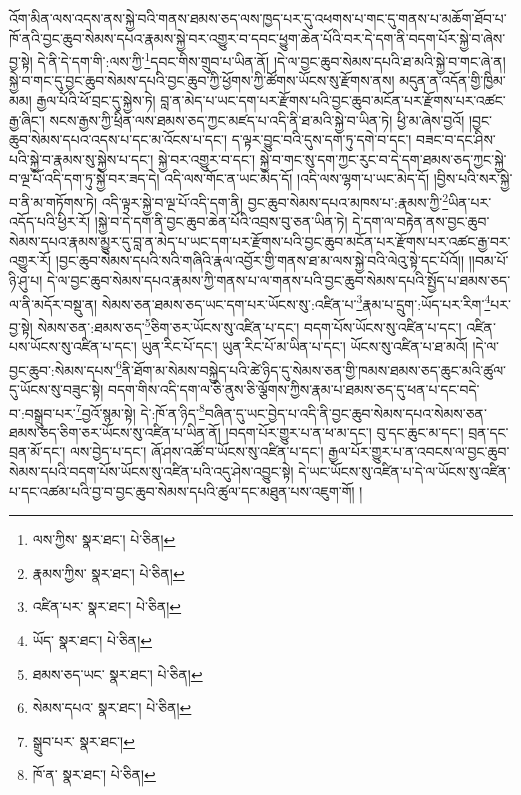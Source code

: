འོག་མིན་ལས་འདས་ནས་སྐྱེ་བའི་གནས་ཐམས་ཅད་ལས་ཁྱད་པར་དུ་འཕགས་པ་གང་དུ་གནས་པ་མཆོག་ཐོབ་པ་ཁོ་ནའི་བྱང་ཆུབ་སེམས་དཔའ་རྣམས་སྐྱེ་བར་འགྱུར་བ་དབང་ཕྱུག་ཆེན་པོའི་བར་དེ་དག་ནི་བདག་པོར་སྐྱེ་བ་ཞེས་བྱ་སྟེ། དེ་ནི་དེ་དག་གི་:ལས་ཀྱི་\footnote{ལས་ཀྱིས་  སྣར་ཐང་།  པེ་ཅིན། }དབང་གིས་གྲུབ་པ་ཡིན་ནོ། །དེ་ལ་བྱང་ཆུབ་སེམས་དཔའི་ཐ་མའི་སྐྱེ་བ་གང་ཞེ་ན། སྐྱེ་བ་གང་དུ་བྱང་ཆུབ་སེམས་དཔའི་བྱང་ཆུབ་ཀྱི་ཕྱོགས་ཀྱི་ཚོགས་ཡོངས་སུ་རྫོགས་ནས། མདུན་ན་འདོན་གྱི་ཁྱིམ་མམ། རྒྱལ་པོའི་ཕོ་བྲང་དུ་སྐྱེས་ཏེ། བླ་ན་མེད་པ་ཡང་དག་པར་རྫོགས་པའི་བྱང་ཆུབ་མངོན་པར་རྫོགས་པར་འཚང་རྒྱ་ཞིང་། སངས་རྒྱས་ཀྱི་ཕྲིན་ལས་ཐམས་ཅད་ཀྱང་མཛད་པ་འདི་ནི་ཐ་མའི་སྐྱེ་བ་ཡིན་ཏེ། ཕྱི་མ་ཞེས་བྱའོ། །བྱང་ཆུབ་སེམས་དཔའ་འདས་པ་དང་མ་འོངས་པ་དང་། ད་ལྟར་བྱུང་བའི་དུས་དག་ཏུ་དགེ་བ་དང་། བཟང་བ་དང་ཤིས་པའི་སྐྱེ་བ་རྣམས་སུ་སྐྱེས་པ་དང་། སྐྱེ་བར་འགྱུར་བ་དང་། སྐྱེ་བ་གང་སུ་དག་ཀྱང་རུང་བ་དེ་དག་ཐམས་ཅད་ཀྱང་སྐྱེ་བ་ལྔ་པོ་འདི་དག་ཏུ་སྐྱེ་བར་ཟད་དེ། འདི་ལས་གོང་ན་ཡང་མེད་དོ། །འདི་ལས་ལྷག་པ་ཡང་མེད་དོ། །བྱིས་པའི་སར་སྐྱེ་བ་ནི་མ་གཏོགས་ཏེ། འདི་ལྟར་སྐྱེ་བ་ལྔ་པོ་འདི་དག་ནི། བྱང་ཆུབ་སེམས་དཔའ་མཁས་པ་:རྣམས་ཀྱི་\footnote{རྣམས་ཀྱིས་  སྣར་ཐང་།  པེ་ཅིན། }ཡིན་པར་འདོད་པའི་ཕྱིར་རོ། །སྐྱེ་བ་དེ་དག་ནི་བྱང་ཆུབ་ཆེན་པོའི་འབྲས་བུ་ཅན་ཡིན་ཏེ། དེ་དག་ལ་བརྟེན་ནས་བྱང་ཆུབ་སེམས་དཔའ་རྣམས་མྱུར་དུ་བླ་ན་མེད་པ་ཡང་དག་པར་རྫོགས་པའི་བྱང་ཆུབ་མངོན་པར་རྫོགས་པར་འཚང་རྒྱ་བར་འགྱུར་རོ། །བྱང་ཆུབ་སེམས་དཔའི་སའི་གཞིའི་རྣལ་འབྱོར་གྱི་གནས་ཐ་མ་ལས་སྐྱེ་བའི་ལེའུ་སྟེ་དང་པོའོ།། །།བམ་པོ་ཉི་ཤུ་པ། དེ་ལ་བྱང་ཆུབ་སེམས་དཔའ་རྣམས་ཀྱི་གནས་པ་ལ་གནས་པའི་བྱང་ཆུབ་སེམས་དཔའི་སྤྱོད་པ་ཐམས་ཅད་ལ་ནི་མདོར་བསྡུ་ན། སེམས་ཅན་ཐམས་ཅད་ཡང་དག་པར་ཡོངས་སུ་:འཛིན་པ་\footnote{འཛིན་པར་  སྣར་ཐང་།  པེ་ཅིན། }རྣམ་པ་དྲུག་:ཡོད་པར་རིག་\footnote{ཡོད་  སྣར་ཐང་།  པེ་ཅིན། }པར་བྱ་སྟེ། སེམས་ཅན་:ཐམས་ཅད་\footnote{ཐམས་ཅད་ཡང་  སྣར་ཐང་།  པེ་ཅིན། }ཅིག་ཅར་ཡོངས་སུ་འཛིན་པ་དང་། བདག་པོས་ཡོངས་སུ་འཛིན་པ་དང་། འཛིན་པས་ཡོངས་སུ་འཛིན་པ་དང་། ཡུན་རིང་པོ་དང་། ཡུན་རིང་པོ་མ་ཡིན་པ་དང་། ཡོངས་སུ་འཛིན་པ་ཐ་མའོ། །དེ་ལ་བྱང་ཆུབ་:སེམས་དཔས་\footnote{སེམས་དཔའ་  སྣར་ཐང་།  པེ་ཅིན། }ནི་ཐོག་མ་སེམས་བསྐྱེད་པའི་ཚེ་ཉིད་དུ་སེམས་ཅན་གྱི་ཁམས་ཐམས་ཅད་ཆུང་མའི་ཚུལ་དུ་ཡོངས་སུ་བཟུང་སྟེ། བདག་གིས་འདི་དག་ལ་ཅི་ནུས་ཅི་ལྕོགས་ཀྱིས་རྣམ་པ་ཐམས་ཅད་དུ་ཕན་པ་དང་བདེ་བ་:བསྒྲུབ་པར་\footnote{སྒྲུབ་པར་  སྣར་ཐང་། }བྱའོ་སྙམ་སྟེ། དེ་:ཁོ་ན་ཉིད་\footnote{ཁོ་ན་  སྣར་ཐང་།  པེ་ཅིན། }བཞིན་དུ་ཡང་བྱེད་པ་འདི་ནི་བྱང་ཆུབ་སེམས་དཔའ་སེམས་ཅན་ཐམས་ཅད་ཅིག་ཅར་ཡོངས་སུ་འཛིན་པ་ཡིན་ནོ། །བདག་པོར་གྱུར་པ་ན་ཕ་མ་དང་། བུ་དང་ཆུང་མ་དང་། བྲན་དང་བྲན་མོ་དང་། ལས་བྱེད་པ་དང་། ཞོ་ཤས་འཚོ་བ་ཡོངས་སུ་འཛིན་པ་དང་། རྒྱལ་པོར་གྱུར་པ་ན་འབངས་ལ་བྱང་ཆུབ་སེམས་དཔའི་བདག་པོས་ཡོངས་སུ་འཛིན་པའི་འདུ་ཤེས་འབྱུང་སྟེ། དེ་ཡང་ཡོངས་སུ་འཛིན་པ་དེ་ལ་ཡོངས་སུ་འཛིན་པ་དང་འཚམ་པའི་བྱ་བ་བྱང་ཆུབ་སེམས་དཔའི་ཚུལ་དང་མཐུན་པས་འཇུག་གོ། །
